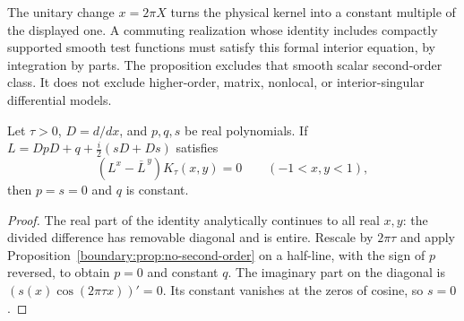 The unitary change $x=2\pi X$ turns the physical kernel into a constant
multiple of the displayed one.  A commuting realization whose identity
includes compactly supported smooth test functions must satisfy this
formal interior equation, by integration by parts.  The proposition
excludes that smooth scalar second-order class.  It does not exclude
higher-order, matrix, nonlocal, or interior-singular differential models.

\begin{corollary}
\label{T10:prop:nocommute}
Let $\tau>0$, $D=d/dx$, and $p,q,s$ be real polynomials. If
$L=DpD+q+\tfrac i2(sD+Ds)$ satisfies
\begin{equation}\label{eshort:commute}
 (L^x-\overline L^{\,y})K_\tau(x,y)=0\qquad(-1<x,y<1),
\end{equation}
then $p=s=0$ and $q$ is constant.
\end{corollary}
\begin{proof}
The real part of the identity analytically continues to all real
$x,y$: the divided difference has removable diagonal and is entire.
Rescale by $2\pi\tau$ and apply Proposition~\ref{boundary:prop:no-second-order}
on a half-line, with the sign of $p$ reversed, to obtain $p=0$ and
constant $q$. The imaginary part on the diagonal is
$(s(x)\cos(2\pi\tau x))'=0$. Its constant vanishes at the zeros of
cosine, so $s=0$.
\end{proof}


